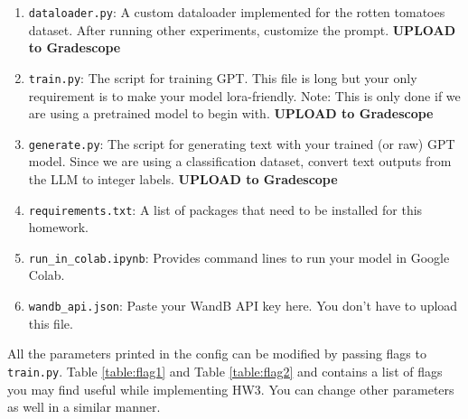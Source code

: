 \documentclass[11pt,addpoints,answers]{exam}
\begin{document}
\begin{questions}
\begin{enumerate}
    \item \lstinline{dataloader.py}: A custom dataloader implemented for the rotten tomatoes dataset. After running other experiments, customize the prompt. \textbf{UPLOAD to Gradescope}
    
    \item \lstinline{train.py}: The script for training GPT. This file is long but your only requirement is to make your model lora-friendly. Note: This is only done if we are using a pretrained model to begin with. \textbf{UPLOAD to Gradescope}
    
    \item \lstinline{generate.py}: The script for generating text with your trained (or raw) GPT model. Since we are using a classification dataset, convert text outputs from the LLM to integer labels. \textbf{UPLOAD to Gradescope}

    \item \lstinline{requirements.txt}: A list of packages that need to be installed for this homework.

    \item \lstinline{run_in_colab.ipynb}: Provides command lines to run your model in Google Colab. 

    \item \lstinline{wandb_api.json}: Paste your WandB API key here. You don't have to upload this file.

\end{enumerate}


All the parameters printed in the config can be modified by passing flags to \lstinline{train.py}. Table \ref{table:flag1} and Table \ref{table:flag2} and contains a list of flags you may find useful while implementing HW3. You can change other parameters as well in a similar manner.


\end{questions}
\end{document}
